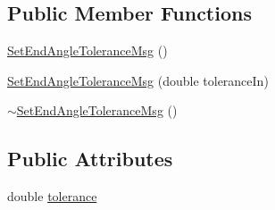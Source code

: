 \subsection*{Public Member Functions}
\begin{DoxyCompactItemize}
\item 
\hyperlink{class_set_end_angle_tolerance_msg_aa226a910ab436be74a320fdc570a50af}{SetEndAngleToleranceMsg} ()
\item 
\hyperlink{class_set_end_angle_tolerance_msg_ad331fe70d7993ad90307cc16614c9fd7}{SetEndAngleToleranceMsg} (double toleranceIn)
\item 
\hyperlink{class_set_end_angle_tolerance_msg_a30e127c7e49de6f9b09c5fed9d30d7bb}{$\sim$SetEndAngleToleranceMsg} ()
\end{DoxyCompactItemize}
\subsection*{Public Attributes}
\begin{DoxyCompactItemize}
\item 
double \hyperlink{class_set_end_angle_tolerance_msg_a70635df975e1602240840236546fa9aa}{tolerance}
\end{DoxyCompactItemize}


